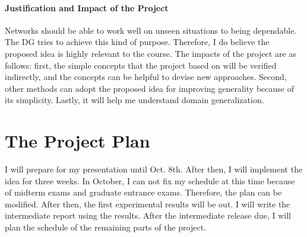 \documentclass[10pt,twocolumn,letterpaper]{article}
\begin{document}
\paragraph{Justification and Impact of the Project}
Networks should be able to work well on unseen situations to being dependable. The DG tries to achieve this kind of purpose. Therefore, I do believe the proposed idea is highly relevant to the course. The impacts of the project are as follows: first, the simple concepts that the project based on will be verified indirectly, and the concepts can be helpful to devise new approaches. Second, other methods can adopt the proposed idea for improving generality because of its simplicity. Lastly, it will help me understand domain generalization.


\section{The Project Plan}
I will prepare for my presentation until Oct. 8th. After then, I will implement the idea for three weeks. In October, I can not fix my schedule at this time because of midterm exams and graduate entrance exams. Therefore, the plan can be modified. After then, the first experimental results will be out. I will write the intermediate report using the results. After the intermediate release due, I will plan the schedule of the remaining parts of the project.
 



{\small


}
\end{document}
